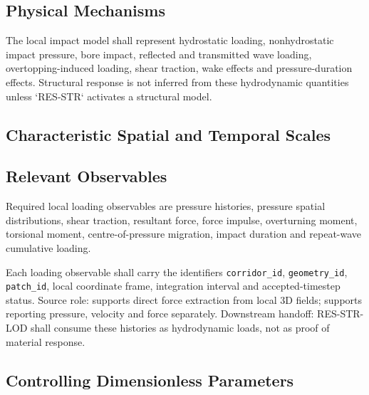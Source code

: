 \subsection{Physical Mechanisms}
\label{sec:res-phy-lod-physical-mechanisms}


The local impact model shall represent hydrostatic loading,
nonhydrostatic impact pressure, bore impact, reflected and transmitted
wave loading, overtopping-induced loading, shear traction, wake effects
and pressure-duration effects. Structural response is not inferred from
these hydrodynamic quantities unless `RES-STR` activates a structural
model.

\subsection{Characteristic Spatial and Temporal Scales}
\label{sec:res-phy-lod-characteristic-spatial-temporal-scales}


\subsection{Relevant Observables}
\label{sec:res-phy-lod-relevant-observables}


Required local loading observables are pressure histories, pressure
spatial distributions, shear traction, resultant force, force impulse,
overturning moment, torsional moment, centre-of-pressure migration,
impact duration and repeat-wave cumulative loading.

Each loading observable shall carry the identifiers
\texttt{corridor\_id}, \texttt{geometry\_id}, \texttt{patch\_id},
local coordinate frame, integration interval and accepted-timestep
status. Source role: \textcite{qin2018comparison} supports direct
force extraction from local 3D fields; \textcite{watanabe2022validation}
supports reporting pressure, velocity and force separately. Downstream
handoff: RES-STR-LOD shall consume these histories as hydrodynamic
loads, not as proof of material response.

\subsection{Controlling Dimensionless Parameters}
\label{sec:res-phy-lod-controlling-dimensionless-parameters}

